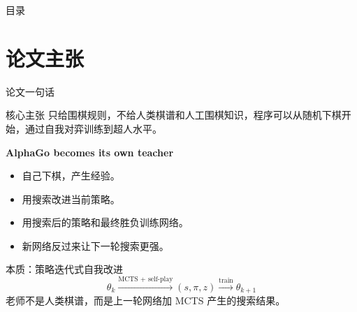 \documentclass[UTF8,aspectratio=169,10pt]{ctexbeamer}
\begin{document}
\begin{frame}{目录}
  \tableofcontents
\end{frame}

\section{论文主张}

\begin{frame}{论文一句话}
  \begin{block}{核心主张}
    只给围棋规则，不给人类棋谱和人工围棋知识，程序可以从随机下棋开始，通过自我对弈训练到超人水平。
  \end{block}

  \vspace{0.2cm}
  \begin{center}
    \Large
    \textbf{AlphaGo becomes its own teacher}
  \end{center}

  \vspace{0.2cm}
  \begin{itemize}
    \item 自己下棋，产生经验。
    \item 用搜索改进当前策略。
    \item 用搜索后的策略和最终胜负训练网络。
    \item 新网络反过来让下一轮搜索更强。
  \end{itemize}

  \begin{alertblock}{本质：策略迭代式自我改进}
    \[
      \theta_k \xrightarrow{\text{MCTS + self-play}} (s,\pi,z)
      \xrightarrow{\text{train}} \theta_{k+1}
    \]
    老师不是人类棋谱，而是上一轮网络加 MCTS 产生的搜索结果。
  \end{alertblock}
\end{frame}
\end{document}
